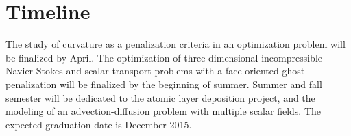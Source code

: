 \documentclass[12pt,letterpaper]{report}
\begin{document}

\section{Timeline}
The study of curvature as a penalization criteria in an optimization problem will be finalized by April. The optimization of three dimensional incompressible Navier-Stokes and scalar transport problems with a face-oriented ghost penalization will be finalized by the beginning of summer. Summer and fall semester will be dedicated to the atomic layer deposition project, and the modeling of an advection-diffusion problem with multiple scalar fields. The expected graduation date is December 2015.






\end{document}

